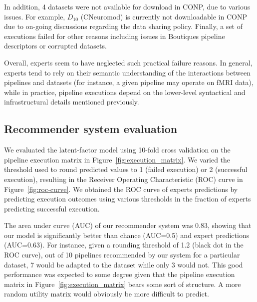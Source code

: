 \documentclass[conference]{IEEEtran}
\begin{document}
In addition, 4 datasets were not available for download in CONP, due to
various issues. For example, $D_{10}$ (CNeuromod) is currently not
downloadable in CONP due to on-going discussions regarding the data sharing policy.
Finally, a set of executions failed for other reasons including issues in
Boutiques pipeline descriptors or corrupted datasets.


Overall, experts seem to have neglected such practical failure reasons. In
general, experts tend to rely on their semantic understanding of the
interactions between pipelines and datasets (for instance, a given pipeline
may operate on fMRI data), while in practice, pipeline executions depend on
the lower-level syntactical and infrastructural details mentioned previously.




\subsection{Recommender system evaluation} 

We evaluated the latent-factor model using 10-fold cross validation on the
pipeline execution matrix in Figure~\ref{fig:execution_matrix}. We varied
the threshold used to round predicted values to 1 (failed execution) or 2
(successful execution), resulting in the Receiver Operating Characteristic
(ROC) curve  in Figure~\ref{fig:roc-curve}. We obtained the ROC curve of
experts predictions by predicting execution outcomes using various
thresholds in the fraction of experts predicting successful execution. 

The area under curve (AUC) of our recommender system was 0.83, showing that
our model is significantly better than chance (AUC=0.5) and expert
predictions (AUC=0.63). For instance, given a rounding threshold of 1.2
(black dot in the ROC curve), out of 10 pipelines
recommended by our system for a particular dataset, 7 would be adapted to
the dataset while only 3 would not. This good performance was expected to some degree given that the pipeline execution matrix in
Figure~\ref{fig:execution_matrix} bears some sort of structure. 
A more random utility matrix would obviously be more difficult to predict.
\end{document}

